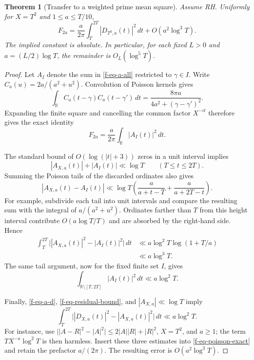 \documentclass[11pt,a4paper]{article}
\newtheorem{theorem}{Theorem}[section]
\theoremstyle{definition}
\theoremstyle{remark}
\begin{document}
\begin{theorem}[Transfer to a weighted prime mean square]
\label{f-thm-mean-square-transfer}
Assume RH.  Uniformly for $X=T^2$ and $1\le a\le T/10$,
\begin{equation}
 F_{2a}=\frac a{2\pi}\int_T^{2T}|D_{T^2,a}(t)|^2\,dt
 +O(a^2\log^3T).
 \label{f-eq-transfer-mean-square}
\end{equation}
The implied constant is absolute.  In particular, for each fixed $L>0$
and $a=(L/2)\log T$, the remainder is $O_L(\log^5T)$.
\end{theorem}

\begin{proof}
Let $A_I$ denote the sum in \eqref{f-eq-a-all} restricted to $\gamma\in I$.
Write $C_a(u)=2a/(a^2+u^2)$.  Convolution of Poisson kernels gives
\[
 \int_{\mathbb R}C_a(t-\gamma)C_a(t-\gamma')\,dt
 =\frac{8\pi a}{4a^2+(\gamma-\gamma')^2}.
\]
Expanding the finite square and cancelling the common factor $X^{-it}$
therefore gives the exact identity
\begin{equation}
 F_{2a}=\frac a{2\pi}\int_{\mathbb R}|A_I(t)|^2\,dt.
 \label{f-eq-poisson-exact}
\end{equation}

The standard bound of $O(\log(|t|+3))$ zeros in a unit interval implies
\[
 |A_{X,a}(t)|+|A_I(t)|\ll\log T\qquad(T\le t\le2T).
\]
Summing the Poisson tails of the discarded ordinates also gives
\begin{equation}
 |A_{X,a}(t)-A_I(t)|\ll\log T
 \left(\frac a{a+t-T}+\frac a{a+2T-t}\right).
 \label{f-eq-boundary-tail}
\end{equation}
For example, subdivide each tail into unit intervals and compare the
resulting sum with the integral of $a/(a^2+u^2)$.  Ordinates farther than
$T$ from this height interval contribute $O(a\log T/T)$ and are absorbed
by the right-hand side.  Hence
\begin{align*}
 \int_T^{2T}\big||A_{X,a}(t)|^2-|A_I(t)|^2\big|\,dt
 &\ll a\log^2T\log(1+T/a)\\
 &\ll a\log^3T.
\end{align*}
The same tail argument, now for the fixed finite set $I$, gives
\[
 \int_{\mathbb R\setminus[T,2T]}|A_I(t)|^2\,dt\ll a\log^2T.
\]

Finally, \eqref{f-eq-a-d}, \eqref{f-eq-residual-bound}, and
$|A_{X,a}|\ll\log T$ imply
\[
 \int_T^{2T}\big||D_{X,a}(t)|^2-|A_{X,a}(t)|^2\big|\,dt
 \ll a\log^2T.
\]
For instance, use $\big||A-R|^2-|A|^2\big|\le2|A||R|+|R|^2$,
$X=T^2$, and $a\ge1$; the term $TX^{-a}\log^2T$ is then harmless.
Insert these three estimates into \eqref{f-eq-poisson-exact} and retain
the prefactor $a/(2\pi)$.  The resulting error is $O(a^2\log^3T)$.
\end{proof}
\end{document}

